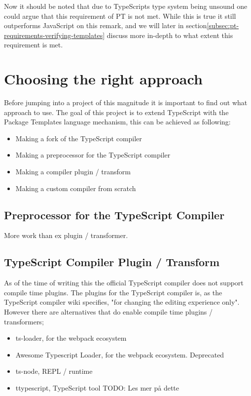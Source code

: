 Now it should be noted that due to TypeScripts type system being unsound one could argue that this requirement of PT is not met.
While this is true it still outperforms JavaScript on this remark, and we will later in section\vref{subsec:pt-requirements-verifying-templates} discuss more in-depth to what extent this requirement is met.



\section{Choosing the right approach}\label{sec:choosing-the-right-approach}

Before jumping into a project of this magnitude it is important to find out what approach to use. 
The goal of this project is to extend TypeScript with the Package Templates language mechanism, this can be achieved as following:

\begin{itemize}
    \item Making a fork of the TypeScript compiler
    \item Making a preprocessor for the TypeScript compiler
    \item Making a compiler plugin / transform
    \item Making a custom compiler from scratch
\end{itemize}


\subsection{Preprocessor for the TypeScript Compiler}\label{subsec:preprocessor-for-the-typescript-compiler}

More work than ex plugin / transformer.

\subsection{TypeScript Compiler Plugin / Transform}\label{subsec:typescript-compiler-plugin}

As of the time of writing this the official TypeScript compiler does not support compile time plugins. The plugins for the TypeScript compiler is, as the TypeScript compiler wiki specifies, "for changing the editing experience only"\cite{tscplugin}.
However there are alternatives that do enable compile time plugins / transformers;

\begin{itemize}
    \item ts-loader\cite{tsloadergithub}, for the webpack ecosystem
    \item Awesome Typescript Loader\cite{awesometypescriptloadergithub}, for the webpack ecosystem. Deprecated
    \item ts-node\cite{tsnodegithub}, REPL / runtime
    \item ttypescript\cite{ttypescriptgithub}, TypeScript tool TODO: Les mer på dette
\end{itemize}

